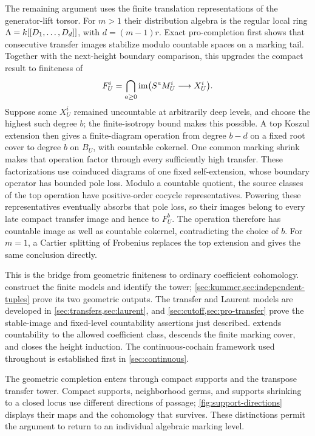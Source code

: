 The remaining argument uses the finite translation representations
of the generator-lift torsor. For $m>1$ their distribution algebra
is the regular local ring
$\Lambda=k[[D_1,\ldots,D_d]]$, with $d=(m-1)r$.
Exact pro-completion first shows that consecutive transfer images
stabilize modulo countable spaces on a marking tail. Together
with the next-height boundary comparison, this upgrades the
compact result to finiteness of
\[
 F^i_U=\bigcap_{a\geq0}
       \operatorname{im}\bigl(S^aM^i_U\longrightarrow X^i_U\bigr).
\]
Suppose some $X^i_U$ remained uncountable at arbitrarily deep
levels, and choose the highest such degree $b$; the finite-isotropy
bound makes this possible. A top Koszul extension then gives a
finite-diagram operation from degree $b-d$ on a fixed root cover
to degree $b$ on $B_U$, with countable cokernel. One common marking
shrink makes that operation factor through every sufficiently
high transfer. These factorizations use coinduced diagrams of
one fixed self-extension, whose boundary operator has bounded
pole loss. Modulo a countable quotient, the source classes of
the top operation have positive-order cocycle representatives.
Powering these representatives eventually absorbs that pole
loss, so their images belong to every late compact
transfer image and hence to $F^b_U$. The operation therefore has
countable image as well as countable cokernel, contradicting the
choice of $b$. For $m=1$, a Cartier splitting of Frobenius
replaces the top extension and gives the same conclusion directly.

This is the bridge from geometric finiteness to ordinary
coefficient cohomology. 
construct the finite models and identify the tower;
\cref{sec:kummer,sec:independent-tuples} prove its two geometric
outputs. The transfer and Laurent models are developed in
\cref{sec:transfers,sec:laurent}, and
\cref{sec:cutoff,sec:pro-transfer} prove the stable-image and
fixed-level countability assertions just described.
 extends countability to the allowed
coefficient class, descends the finite marking cover, and closes
the height induction. The continuous-cochain framework used
throughout is established first in \cref{sec:continuous}.

The geometric completion enters through compact supports and the
transpose transfer tower. Compact supports, neighborhood germs,
and supports shrinking to a closed locus use different directions
of passage; \cref{fig:support-directions} displays their maps and
the cohomology that survives. These distinctions permit the
argument to return to an individual algebraic marking level.

